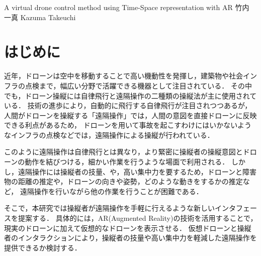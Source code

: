 \documentclass[a4paper,10pt,twocolumn,uplatex]{jsarticle}
\date{9}
\begin{document}
{A virtual drone control method using Time-Space representation with AR}
{竹内 一真}
{Kazuma Takeuchi}

\section{はじめに}
近年，ドローンは空中を移動することで高い機動性を発揮し，建築物や社会インフラの点検まで，幅広い分野で活躍できる機器として注目されている．
その中でも，ドローン操縦には自律飛行と遠隔操作の二種類の操縦法が主に使用されている\cite{sample}．
技術の進歩により，自動的に飛行する自律飛行が注目されつつあるが，人間がドローンを操縦する「遠隔操作」では，人間の意図を直接ドローンに反映できる利点があるため，
ドローンを用いて事故を起こすわけにはいかないようなインフラの点検などでは，遠隔操作による操縦が行われている．
\par
このように遠隔操作は自律飛行とは異なり，より緊密に操縦者の操縦意図とドローンの動作を結びつける，細かい作業を行うような場面で利用される．
しかし，遠隔操作には操縦者の技量、や，高い集中力を要するため，ドローンと障害物の距離の推定や，ドローンの向きや姿勢，どのような動きをするかの推定など，
遠隔操作を行いながら他の作業を行うことが困難である\cite{teleoperate}．
\par
そこで，本研究では操縦者が遠隔操作を手軽に行えるような新しいインタフェースを提案する．
具体的には，AR(Augmented Reality)の技術を活用することで，現実のドローンに加えて仮想的なドローンを表示させる．
仮想ドローンと操縦者のインタラクションにより，操縦者の技量や高い集中力を軽減した遠隔操作を提供できるか検討する．
\par

\end{document}

